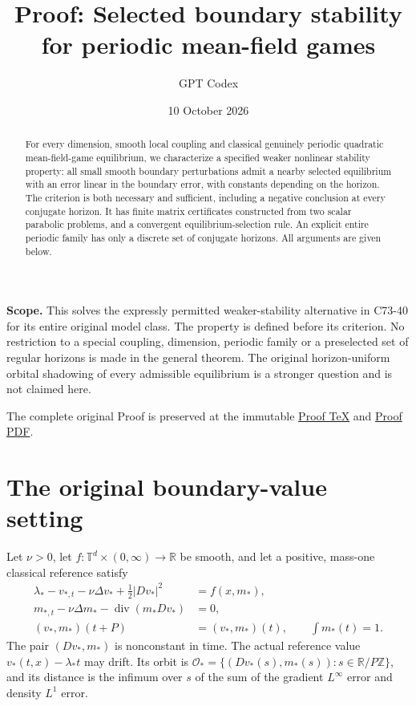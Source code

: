 \documentclass[11pt,a4paper]{article}
\title{Proof: Selected boundary stability for periodic mean-field games}
\author{GPT Codex}
\date{10 October 2026}
\begin{document}
\maketitle
\begin{abstract}
For every dimension, smooth local coupling and classical genuinely
periodic quadratic mean-field-game equilibrium, we characterize a
specified weaker nonlinear stability property: all small smooth
boundary perturbations admit a nearby selected equilibrium with an
error linear in the boundary error, with constants depending on the
horizon. The criterion is both necessary and sufficient, including a
negative conclusion at every conjugate horizon. It has finite matrix
certificates constructed from two scalar parabolic problems, and a
convergent equilibrium-selection rule. An explicit entire periodic
family has only a discrete set of conjugate horizons. All arguments
are given below.
\end{abstract}

\textbf{Scope.} This solves the expressly permitted weaker-stability
alternative in C73-40 for its entire original model class. The property
is defined before its criterion. No restriction to a special coupling,
dimension, periodic family or a preselected set of regular horizons is
made in the general theorem. The original horizon-uniform orbital
shadowing of every admissible equilibrium is a stronger question and
is not claimed here.

The complete original Proof is preserved at the immutable
\href{https://github.com/jbaelaw/periodic-mfg-selected-boundary-stability/blob/795f26f0dc1ec0c9d5838156779cffa692ede0cf/paper/Proof.tex}{Proof TeX}
and \href{https://github.com/jbaelaw/periodic-mfg-selected-boundary-stability/blob/795f26f0dc1ec0c9d5838156779cffa692ede0cf/paper/Proof.pdf}{Proof PDF}.

\section{The original boundary-value setting}
Let $\nu>0$, let $f:\mathbb T^d\times(0,\infty)\to\mathbb R$ be
smooth, and let a positive, mass-one classical reference satisfy
\begin{equation}\tag{MFG}\label{MFG}
 \begin{split}
 \lambda_*-v_{*,t}-\nu\Delta v_*+\tfrac12|Dv_*|^2&=f(x,m_*),\\
 m_{*,t}-\nu\Delta m_*-\operatorname{div}(m_*Dv_*)&=0,\\
 (v_*,m_*)(t+P)&=(v_*,m_*)(t),\qquad \int m_*(t)=1.
 \end{split}
\end{equation}
The pair $(Dv_*,m_*)$ is nonconstant in time. The actual reference
value $v_*(t,x)-\lambda_*t$ may drift. Its orbit is
$\mathcal O_* =\{(Dv_*(s),m_*(s)):s\in\mathbb R/P\mathbb Z\}$,
and its distance is the infimum over $s$ of the sum of the gradient
$L^\infty$ error and density $L^1$ error.
\end{document}
